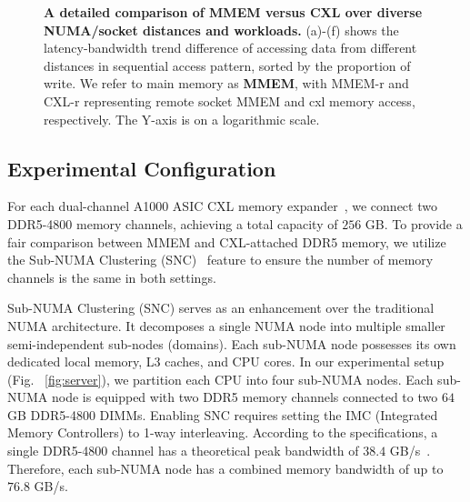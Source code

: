 \begin{figure}[t]
{  \label{fig:writeonly}}%
 \caption[A detailed comparison of MMEM versus CXL over diverse NUMA/socket distances and workloads]{\textbf{A detailed comparison of MMEM versus CXL over diverse NUMA/socket distances and workloads.} (a)-(f) shows the latency-bandwidth trend difference of accessing data from different distances in sequential access pattern, sorted by the proportion of write. We refer to main memory as \textbf{MMEM}, with MMEM-r and CXL-r representing remote socket MMEM and cxl memory access, respectively. The Y-axis is on a logarithmic scale.}
\label{fig:microbench-2}
\end{figure}

\subsection{Experimental Configuration}
\label{ssec:config}
For each dual-channel A1000 ASIC CXL memory expander~\cite{A1000}, we connect two DDR5-4800 memory channels, achieving a total capacity of $256$ GB. To provide a fair comparison between MMEM and CXL-attached DDR5 memory, we utilize the Sub-NUMA Clustering (SNC)~\cite{snc} feature to ensure the number of memory channels is the same in both settings. 

 Sub-NUMA Clustering (SNC) serves as an enhancement over the traditional NUMA architecture. It decomposes a single NUMA node into multiple smaller semi-independent sub-nodes (domains). Each sub-NUMA node possesses its own dedicated local memory, L3 caches, and CPU cores. In our experimental setup (Fig. ~\ref{fig:server}), we partition each CPU into four sub-NUMA nodes. Each sub-NUMA node is equipped with two DDR5 memory channels connected to two $64$ GB DDR5-4800 DIMMs. Enabling SNC requires setting the IMC (Integrated Memory Controllers) to 1-way interleaving. According to the specifications, a single DDR5-4800 channel has a theoretical peak bandwidth of $38.4$ GB/s~\cite{cxlcentric}. Therefore, each sub-NUMA node has a combined memory bandwidth of up to $76.8$ GB/s.

